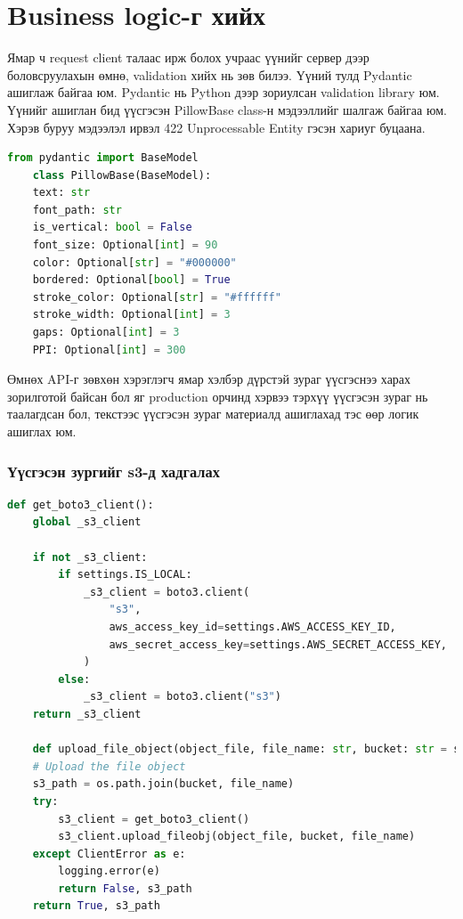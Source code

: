 \section{Business logic-г хийх}
Ямар ч request client талаас ирж болох учраас үүнийг сервер дээр боловсруулахын өмнө, validation хийх нь зөв билээ. Үүний тулд Pydantic ашиглаж байгаа юм. Pydantic нь Python дээр зориулсан validation library юм. Үүнийг ашиглан бид үүсгэсэн PillowBase class-н мэдээллийг шалгаж байгаа юм. Хэрэв буруу мэдээлэл ирвэл 422 Unprocessable Entity гэсэн хариуг буцаана.
\begin{lstlisting}[language=Python,caption={Pydantic Validator},frame=single]
	from pydantic import BaseModel
	class PillowBase(BaseModel):
    text: str
    font_path: str
    is_vertical: bool = False
    font_size: Optional[int] = 90
    color: Optional[str] = "#000000"
    bordered: Optional[bool] = True
    stroke_color: Optional[str] = "#ffffff"
    stroke_width: Optional[int] = 3
    gaps: Optional[int] = 3
    PPI: Optional[int] = 300
\end{lstlisting}
Өмнөх API-г зөвхөн хэрэглэгч ямар хэлбэр дүрстэй зураг үүсгэснээ харах зорилготой байсан бол яг production орчинд хэрвээ тэрхүү үүсгэсэн зураг нь таалагдсан бол, текстээс үүсгэсэн зураг материалд ашиглахад тэс өөр логик ашиглах юм.

\subsubsection{Үүсгэсэн зургийг s3-д хадгалах}

\begin{lstlisting}[language=Python,caption={Үүсгэсэн зургийг s3-д хадгалах},frame=single]
	def get_boto3_client():
    global _s3_client

    if not _s3_client:
        if settings.IS_LOCAL:
            _s3_client = boto3.client(
                "s3",
                aws_access_key_id=settings.AWS_ACCESS_KEY_ID,
                aws_secret_access_key=settings.AWS_SECRET_ACCESS_KEY,
            )
        else:
            _s3_client = boto3.client("s3")
    return _s3_client

	def upload_file_object(object_file, file_name: str, bucket: str = settings.GENERATION_S3_BUCKET):
    # Upload the file object
    s3_path = os.path.join(bucket, file_name)
    try:
        s3_client = get_boto3_client()
        s3_client.upload_fileobj(object_file, bucket, file_name)
    except ClientError as e:
        logging.error(e)
        return False, s3_path
    return True, s3_path

\end{lstlisting}



